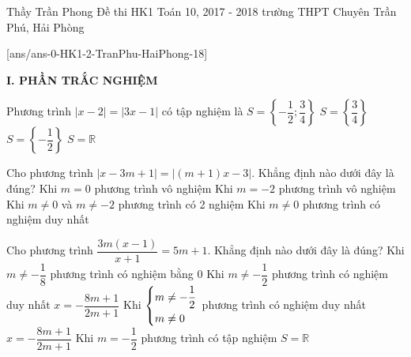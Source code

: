 	\begin{name}
		{Thầy Trần Phong}
		{Đề thi HK1 Toán 10, 2017 - 2018 trường THPT Chuyên Trần Phú, Hải Phòng}
	\end{name}
	\setcounter{ex}{0}\setcounter{bt}{0}
	[ans/ans-0-HK1-2-TranPhu-HaiPhong-18]

\noindent\textbf{I. PHẦN TRẮC NGHIỆM}

\begin{ex}%
Phương trình $|x-2|=|3x-1|$ có tập nghiệm là
\choice
{\True $S=\left\{-\dfrac{1}{2};\dfrac{3}{4} \right\}$}
{$S=\left\{\dfrac{3}{4} \right\}$}
{$S=\left\{-\dfrac{1}{2}\right\}$}
{$S=\mathbb R$}
\end{ex}

\begin{ex}%
Cho phương trình $|x-3m+1|=|(m+1)x-3|$. Khẳng định nào dưới đây là đúng?
\choice
{Khi $m=0$ phương trình vô nghiệm}
{Khi $m=-2$ phương trình vô nghiệm}
{\True Khi $m\ne0$ và $m\ne-2$ phương trình có 2 nghiệm}
{Khi $m\ne0$ phương trình có nghiệm duy nhất}
\end{ex}

\begin{ex}%
Cho phương trình $\dfrac{3m(x-1)}{x+1}=5m+1$. Khẳng định nào dưới đây là đúng?
\choice
{Khi $m\ne-\dfrac{1}{8}$ phương trình có nghiệm bằng $0$}
{Khi $m\ne-\dfrac{1}{2}$ phương trình có nghiệm duy nhất $x=-\dfrac{8m+1}{2m+1}$}
{\True Khi $\left\{\begin{aligned}&m\ne-\dfrac{1}{2}\\& m\ne0\end{aligned}\right.$ phương trình có nghiệm duy nhất $x=-\dfrac{8m+1}{2m+1}$}
{Khi $m=-\dfrac{1}{2}$ phương trình có tập nghiệm $S=\mathbb R$}
\end{ex}

